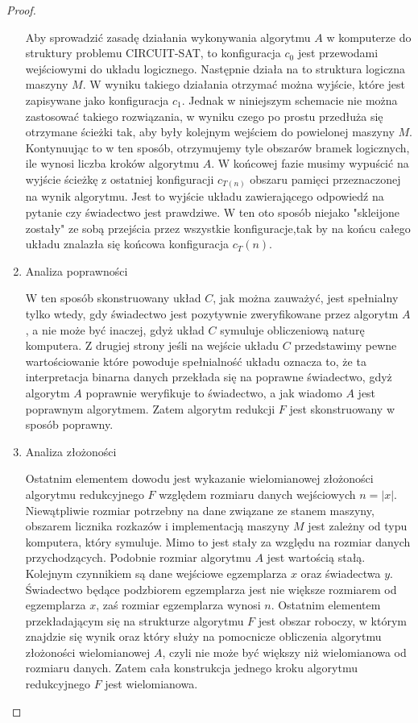 \begin{proof}
\begin{enumerate}
Aby sprowadzić zasadę działania wykonywania algorytmu $A$ w komputerze do struktury problemu CIRCUIT-SAT, to konfiguracja $c_{0}$ jest przewodami wejściowymi do układu logicznego. Następnie działa na to struktura logiczna maszyny $M$. W wyniku takiego działania otrzymać można wyjście, które jest zapisywane jako konfiguracja $c_{1}$. Jednak w niniejszym schemacie nie można zastosować takiego rozwiązania, w wyniku czego po prostu przedłuża się otrzymane ścieżki tak, aby były kolejnym wejściem do powielonej maszyny $M$. Kontynuując to w ten sposób, otrzymujemy tyle obszarów bramek logicznych, ile wynosi liczba kroków algorytmu $A$. W końcowej fazie musimy wypuścić na wyjście ścieżkę z ostatniej konfiguracji $c_{T(n)}$ obszaru pamięci przeznaczonej na wynik algorytmu. Jest to wyjście układu zawierającego odpowiedź na pytanie czy świadectwo jest prawdziwe. W ten oto sposób niejako "skleijone zostały" ze sobą przejścia przez wszystkie konfiguracje,tak by na końcu całego układu znalazła się końcowa konfiguracja $c_T(n)$.

\item Analiza poprawności

W ten sposób skonstruowany układ $C$, jak można zauważyć, jest spełnialny tylko wtedy, gdy świadectwo jest pozytywnie zweryfikowane przez algorytm $A$, a nie może być inaczej, gdyż układ $C$ symuluje obliczeniową naturę komputera. Z drugiej strony jeśli na wejście układu $C$ przedstawimy pewne wartościowanie które powoduje spełnialność układu oznacza to, że ta interpretacja binarna danych przekłada się na poprawne świadectwo, gdyż algorytm $A$ poprawnie weryfikuje to świadectwo, a jak wiadomo $A$ jest poprawnym algorytmem. Zatem algorytm redukcji $F$ jest skonstruowany w sposób poprawny.

\item Analiza złożoności

Ostatnim elementem dowodu jest wykazanie wielomianowej złożoności algorytmu redukcyjnego $F$ względem rozmiaru danych wejściowych $n=|x|$. Niewątpliwie rozmiar potrzebny na dane związane ze stanem maszyny, obszarem licznika rozkazów i implementacją maszyny $M$ jest zależny od typu komputera, który symuluje. Mimo to jest stały za względu na rozmiar danych przychodzących. Podobnie rozmiar algorytmu $A$ jest wartością stałą. Kolejnym czynnikiem są dane wejściowe egzemplarza $x$ oraz świadectwa $y$. Świadectwo będące podzbiorem egzemplarza jest nie większe rozmiarem od egzemplarza $x$, zaś rozmiar egzemplarza wynosi $n$. Ostatnim elementem przekładającym się na strukturze algorytmu $F$ jest obszar roboczy, w którym znajdzie się wynik oraz który służy na pomocnicze obliczenia algorytmu złożoności wielomianowej $A$, czyli nie może być większy niż wielomianowa od rozmiaru danych. Zatem cała konstrukcja jednego kroku algorytmu redukcyjnego $F$ jest wielomianowa.


\end{enumerate}
\end{proof}
